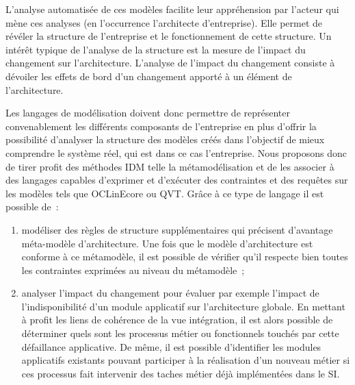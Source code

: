 L'analyse automatisée de ces modèles facilite leur appréhension par l'acteur qui
mène ces analyses (en l'occurrence l'architecte d'entreprise). Elle permet de
révéler la structure de l'entreprise et le fonctionnement de cette structure. Un
intérêt typique de l'analyse de la structure est la mesure de l'impact du
changement \cite{de2005change} sur l'architecture. L'analyse de l'impact du
changement consiste à dévoiler les effets de bord d'un changement apporté à un
élément de l'architecture.

Les langages de modélisation doivent donc permettre de représenter
convenablement les différents composants de l'entreprise en plus d'offrir la
possibilité d'analyser la structure des modèles créés dans l'objectif de mieux
comprendre le système réel, qui est dans ce cas l'entreprise. Nous proposons
donc de tirer profit des méthodes IDM telle la métamodélisation et de les
associer à des langages capables d'exprimer et d'exécuter des contraintes et des
requêtes sur les modèles tels que OCLinEcore ou QVT. Grâce à ce type de langage
il est possible de~:

\begin{enumerate}
\item modéliser des règles de structure supplémentaires qui précisent d'avantage méta-modèle d'architecture. Une fois
que le modèle d'architecture est conforme à ce métamodèle, il est possible de
vérifier qu'il respecte bien toutes les contraintes exprimées au niveau du
métamodèle~;
\item analyser l'impact du changement pour évaluer par exemple
l'impact de l'indisponibilité d'un module applicatif sur l'architecture
globale. En mettant à profit les liens de cohérence de la vue intégration, il
est alors possible de déterminer quels sont les processus métier ou
fonctionnels touchés par cette défaillance applicative. De même, il est
possible d'identifier les modules applicatifs existants pouvant participer à la
réalisation d'un nouveau métier si ces processus fait intervenir des taches
métier déjà implémentées dans le SI.
\end{enumerate}





